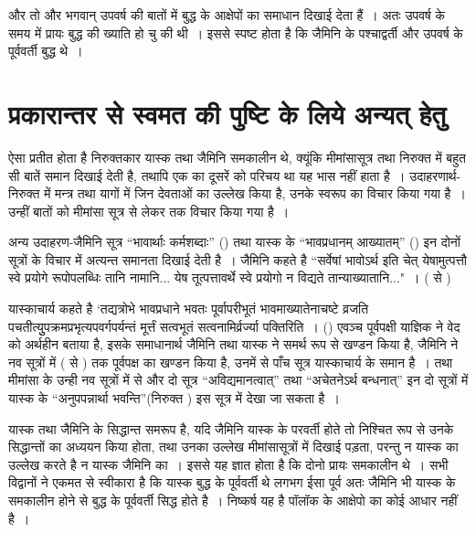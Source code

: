 और तो और भगवान् उपवर्ष की बातों में बुद्ध के आक्षेपों का समाधान दिखाई देता हैं~। अतः उपवर्ष के समय में प्रायः बुद्ध की ख्याति हो चु की थी~। इससे स्पष्ट होता है कि जैमिनि के पश्चाद्वर्ती और उपवर्ष के पूर्ववर्ती बुद्ध थे~। 

\section*{प्रकारान्तर से स्वमत की पुष्टि के लिये अन्यत् हेतु}

ऐसा प्रतीत होता है निरुक्तकार यास्क तथा जैमिनि समकालीन थे, क्यूंकि मीमांसासूत्र तथा निरुक्त में बहुत सी बातें समान दिखाई देती है, तथापि एक का दूसरें को परिचय था यह भास नहीं हाता है~। उदाहरणार्थ-निरुक्त  में मन्त्र तथा यागों में जिन देवताओं का उल्लेख किया है, उनके स्वरूप का विचार किया गया है~। उन्हीं बातों को मीमांसा सूत्र  से लेकर  तक विचार किया गया है~। 

अन्य उदाहरण-जैमिनि सूत्र “भावार्थाः कर्मशब्दाः” () तथा यास्क के “भावप्रधानम् आख्यातम्” () इन दोनों सूत्रों के विचार में अत्यन्त समानता दिखाई देती है~। जैमिनि कहते है “सर्वेषां भावोऽर्थ इति चेत् येषामुत्पत्तौ स्वे प्रयोगे रूपोपलब्धिः तानि नामानि... येष तूत्पत्तावर्थे स्वे प्रयोगो न विद्यते तान्याख्यातानि..."~। ( से )

यास्काचार्य कहते है ‘तद्यत्रोभे भावप्रधाने भवतः पूर्वापरीभूतं भावमाख्यातेनाचष्टे व्रजति पचतीत्युुपक्रमप्रभृत्यपवर्गपर्यन्तं मूर्त्तं सत्वभूतं सत्वनामिर्व्रर्ज्या पक्तिरिति~। () एवञ्च पूर्वपक्षी याज्ञिक ने वेद को अर्थहीन बताया है, इसके समाधानार्थ जैमिनि तथा यास्क ने समर्थ रूप से खण्डन किया है, जैमिनि ने नव सूत्रों में ( से ) तक पूर्वपक्ष का खण्डन किया है, उनमें से पाँच सूत्र यास्काचार्य के समान है~। तथा मीमांसा के उन्ही नव सूत्रों में से और दो सूत्र “अविद्यमानत्वात्” तथा “अचेतनेऽर्थ बन्धनात्” इन दो सूत्रों में यास्क के “अनुपपन्नार्था भवन्ति”(निरुक्त ) इस सूत्र में देखा जा सकता है~।

यास्क तथा जैमिनि के सिद्धान्त समरूप है, यदि जैमिनि यास्क के परवर्ती होते तो निश्चित रूप से उनके सिद्धान्तों का अध्ययन किया होता, तथा उनका उल्लेख मीमांसासूत्रों में दिखाई पड़ता, परन्तु न यास्क का उल्लेख करते है न यास्क जैमिनि का~। इससे यह ज्ञात होता है कि दोनो प्रायः समकालीन थे~। सभी विद्वानों ने एकमत से स्वीकारा है कि यास्क बुद्ध के पूर्ववर्ती थे लगभग  ईसा पूर्व अतः जैमिनि भी यास्क के समकालीन होने से बुद्ध के पूर्ववर्ती सिद्ध होते है~। निष्कर्ष यह है पॉलॉक के आक्षेपो का कोई आधार नहीं है~।


